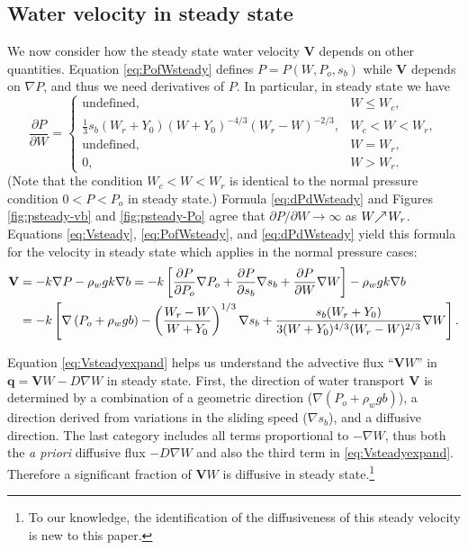 \documentclass[11pt,final]{amsart}
\newcommand\bV{\mathbf{V}}
\newcommand\bq{\mathbf{q}}
\newcommand{\grad}{\nabla}
\begin{document}
\subsection*{Water velocity in steady state}  We now consider how the steady state water velocity $\bV$ depends on other quantities.  Equation \eqref{eq:PofWsteady} defines $P=P(W,P_o,s_b)$ while $\bV$ depends on $\grad P$, and thus we need derivatives of $P$.  In particular, in steady state we have
\begin{equation}
\frac{\partial P}{\partial W} =
    \begin{cases}
      \text{undefined}, & W \le W_c, \\
      \frac{1}{3} s_b (W_r + Y_0) (W+Y_0)^{-4/3} (W_r - W)^{-2/3}, & W_c < W < W_r, \\
      \text{undefined}, & W = W_r, \\
      0, & W > W_r.
    \end{cases}  \label{eq:dPdWsteady}
\end{equation}
(Note that the condition $W_c < W < W_r$ is identical to the normal pressure condition $0 < P < P_o$ in steady state.)  Formula \eqref{eq:dPdWsteady} and Figures \ref{fig:psteady-vb} and \ref{fig:psteady-Po} agree that $\partial P / \partial W \to \infty$ as $W \!\!\nearrow\! W_r$.  Equations \eqref{eq:Vsteady}, \eqref{eq:PofWsteady}, and \eqref{eq:dPdWsteady} yield this formula for the velocity in steady state which applies in the normal pressure cases:
\begin{align}
\bV &= - k \grad P - \rho_w g k \grad b = - k \left[\frac{\partial P}{\partial P_o} \grad P_o + \frac{\partial P}{\partial s_b} \grad s_b + \frac{\partial P}{\partial W} \grad W\right] - \rho_w g k \grad b  \notag \\
    &= - k \left[\grad \left(P_o + \rho_w g b\right) - \left(\frac{W_r - W}{W+Y_0}\right)^{1/3} \grad s_b + \frac{s_b (W_r + Y_0)}{3  (W+Y_0)^{4/3} (W_r - W)^{2/3}} \grad W\right]. \label{eq:Vsteadyexpand}
\end{align}

Equation \eqref{eq:Vsteadyexpand} helps us understand the advective flux ``$\bV W$'' in $\bq=\bV W - D \grad W$ in steady state.  First, the direction of water transport $\bV$ is determined by a combination of a geometric direction ($\grad \left(P_o + \rho_w g b\right)$), a direction derived from variations in the sliding speed ($\grad s_b$), and a diffusive direction.  The last category includes all terms proportional to $-\grad W$, thus both the \emph{a priori} diffusive flux $- D \grad W$ and also the third term in \eqref{eq:Vsteadyexpand}.  Therefore a significant fraction of $\bV W$ is diffusive in steady state.\footnote{To our knowledge, the identification of the diffusiveness of this steady velocity is new to this paper.}
\end{document}
